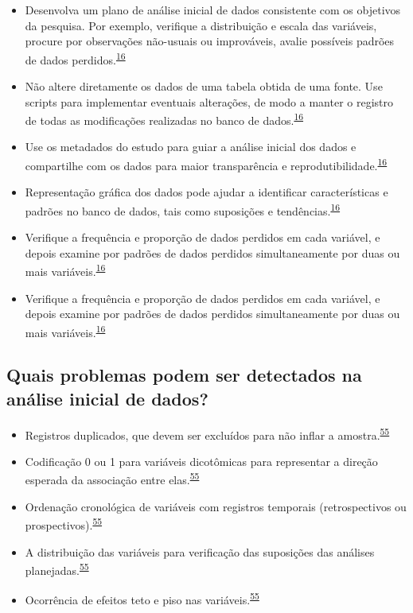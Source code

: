 \documentclass[
]{book}
\begin{document}
\begin{itemize}
\item
  Desenvolva um plano de análise inicial de dados consistente com os objetivos da pesquisa. Por exemplo, verifique a distribuição e escala das variáveis, procure por observações não-usuais ou improváveis, avalie possíveis padrões de dados perdidos.\textsuperscript{\protect\hyperlink{ref-Baillie2022}{16}}
\item
  Não altere diretamente os dados de uma tabela obtida de uma fonte. Use scripts para implementar eventuais alterações, de modo a manter o registro de todas as modificações realizadas no banco de dados.\textsuperscript{\protect\hyperlink{ref-Baillie2022}{16}}
\item
  Use os metadados do estudo para guiar a análise inicial dos dados e compartilhe com os dados para maior transparência e reprodutibilidade.\textsuperscript{\protect\hyperlink{ref-Baillie2022}{16}}
\item
  Representação gráfica dos dados pode ajudar a identificar características e padrões no banco de dados, tais como suposições e tendências.\textsuperscript{\protect\hyperlink{ref-Baillie2022}{16}}
\item
  Verifique a frequência e proporção de dados perdidos em cada variável, e depois examine por padrões de dados perdidos simultaneamente por duas ou mais variáveis.\textsuperscript{\protect\hyperlink{ref-Baillie2022}{16}}
\item
  Verifique a frequência e proporção de dados perdidos em cada variável, e depois examine por padrões de dados perdidos simultaneamente por duas ou mais variáveis.\textsuperscript{\protect\hyperlink{ref-Baillie2022}{16}}
\end{itemize}

\hypertarget{quais-problemas-podem-ser-detectados-na-anuxe1lise-inicial-de-dados}{%
\subsection{Quais problemas podem ser detectados na análise inicial de dados?}\label{quais-problemas-podem-ser-detectados-na-anuxe1lise-inicial-de-dados}}

\begin{itemize}
\item
  Registros duplicados, que devem ser excluídos para não inflar a amostra.\textsuperscript{\protect\hyperlink{ref-huebner2016}{55}}
\item
  Codificação 0 ou 1 para variáveis dicotômicas para representar a direção esperada da associação entre elas.\textsuperscript{\protect\hyperlink{ref-huebner2016}{55}}
\item
  Ordenação cronológica de variáveis com registros temporais (retrospectivos ou prospectivos).\textsuperscript{\protect\hyperlink{ref-huebner2016}{55}}
\item
  A distribuição das variáveis para verificação das suposições das análises planejadas.\textsuperscript{\protect\hyperlink{ref-huebner2016}{55}}
\item
  Ocorrência de efeitos teto e piso nas variáveis.\textsuperscript{\protect\hyperlink{ref-huebner2016}{55}}
\end{itemize}
\end{document}
